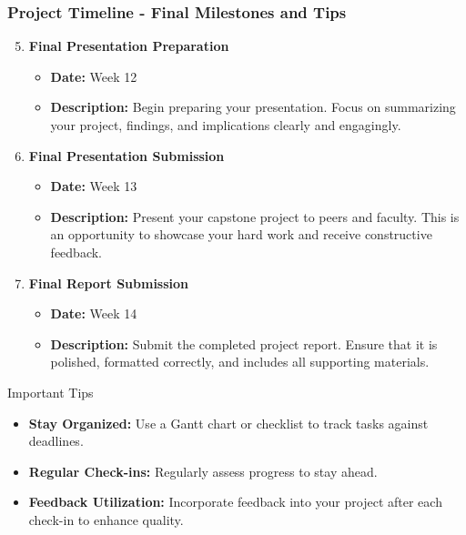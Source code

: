 \documentclass[aspectratio=169]{beamer}
\begin{document}
\begin{frame}[fragile]
  \frametitle{Project Timeline - Final Milestones and Tips}
  \begin{enumerate}
    \setcounter{enumi}{4} %
    \item \textbf{Final Presentation Preparation}
      \begin{itemize}
        \item \textbf{Date:} Week 12
        \item \textbf{Description:} Begin preparing your presentation. Focus on summarizing your project, findings, and implications clearly and engagingly.
      \end{itemize}

    \item \textbf{Final Presentation Submission}
      \begin{itemize}
        \item \textbf{Date:} Week 13
        \item \textbf{Description:} Present your capstone project to peers and faculty. This is an opportunity to showcase your hard work and receive constructive feedback.
      \end{itemize}

    \item \textbf{Final Report Submission}
      \begin{itemize}
        \item \textbf{Date:} Week 14
        \item \textbf{Description:} Submit the completed project report. Ensure that it is polished, formatted correctly, and includes all supporting materials.
      \end{itemize}
  \end{enumerate}

  \begin{block}{Important Tips}
    \begin{itemize}
      \item \textbf{Stay Organized:} Use a Gantt chart or checklist to track tasks against deadlines.
      \item \textbf{Regular Check-ins:} Regularly assess progress to stay ahead.
      \item \textbf{Feedback Utilization:} Incorporate feedback into your project after each check-in to enhance quality.
    \end{itemize}
  \end{block}
\end{frame}
\end{document}
